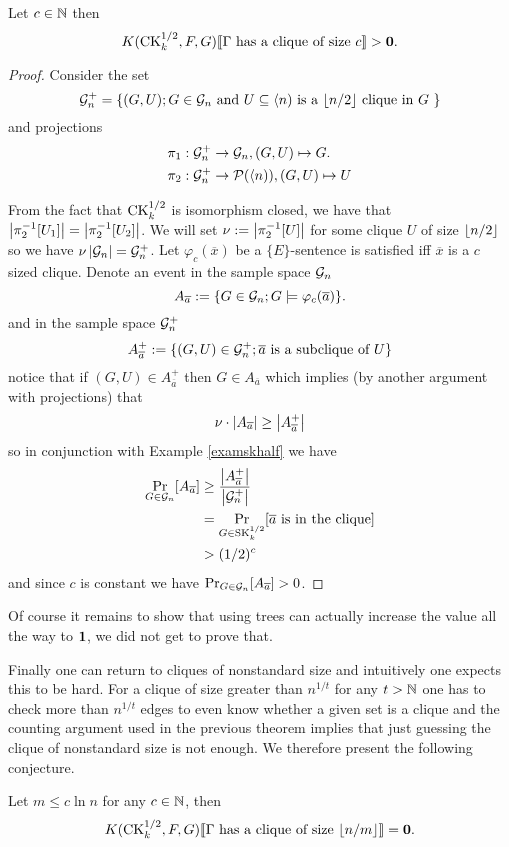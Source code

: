 \begin{thrm}\label{thrmck}
Let $c\in\mathbb{N}$ then 
\[K(\text{CK}_k^{1/2},F,G)\llbracket\text{$\Gamma$ has a clique of size $c$}\rrbracket>\textbf{0}.\]
\end{thrm}
\begin{proof}
Consider the set \[\mathcal{G}_n^+=\{(G,U);\text{$G\in \mathcal{G}_n$ and $U\subseteq \langle n)$ is a $\left \lfloor {n/2} \right \rfloor$ clique in $G$ }\}\]
and projections
\begin{align*}
\pi_1:\mathcal{G}_n^+&\to\mathcal{G}_n,(G,U)\mapsto G.\\
\pi_2:\mathcal{G}_n^+&\to\mathcal{P}(\langle n)),(G,U)\mapsto U
\end{align*}

From the fact that $\text{CK}_k^{1/2}$ is isomorphism closed, we have that $\left|{\pi_2^{-1}[U_1]}\right|=\left|{\pi_2^{-1}[U_2]}\right|$. We will set $\nu:=\left|{\pi_2^{-1}[U]}\right|$ for some clique $U$ of size $\left \lfloor {n/2} \right \rfloor$ so we have $\nu\left|{\mathcal{G}_n}\right|=\mathcal{G}_n^+$. Let $\varphi_c(\overline x)$ be a $\{E\}$-sentence is satisfied iff $\overline x$ is a $c$ sized clique.  Denote an event in the sample space $\mathcal{G}_n$
\[A_{\overline a} :=\{G\in\mathcal{G}_n;G\models \varphi_c(\overline a)\}.\]
and in the sample space $\mathcal{G}_n^+$
\[A_{\overline a}^+ :=\{(G,U)\in\mathcal{G}_n^+;\overline a\text{ is a subclique of $U$}\}\]
notice that if $(G,U)\in A_{\overline a}^+$ then $G\in A_{\overline a}$ which implies (by another argument with projections) that
\[\nu\cdot\left|{A_{\overline a}}\right|\geq \left|{A_{\overline a}^+}\right|\]
so in conjunction with Example \ref{examskhalf} we have
\begin{align*}
\Pr_{G\in\mathcal{G}_n}[A_{\overline a}]&\geq \frac{\left|{A_{\overline a}^+}\right|}{\left|{\mathcal{G}_n^+}\right|}\\
&= \Pr_{G\in\text{SK}_{k}^{1/2}}[\overline a \text{ is in the clique}]\\
&>(1/2)^c
\end{align*}
and since $c$ is constant we have $\Pr_{G\in\mathcal{G}_n}[A_{\overline a}]>0$.
\end{proof}

Of course it remains to show that using trees can actually increase the value all the way to $\textbf{1}$, we did not get to prove that.

Finally one can return to cliques of nonstandard size and intuitively one expects this to be hard. For a clique of size greater than $n^{1/t}$ for any $t>\mathbb{N}$ one has to check more than $n^{1/t}$ edges to even know whether a given set is a clique and the counting argument used in the previous theorem implies that just guessing the clique of nonstandard size is not enough. We therefore present the following conjecture.

\begin{conj}
Let $m\leq c \ln n$ for any $c\in\mathbb{N}$, then
\[K(\text{CK}_k^{1/2},F,G)\llbracket\text{$\Gamma$ has a clique of size $\left \lfloor {n/m} \right \rfloor$}\rrbracket=\textbf{0}.\]
\end{conj}
